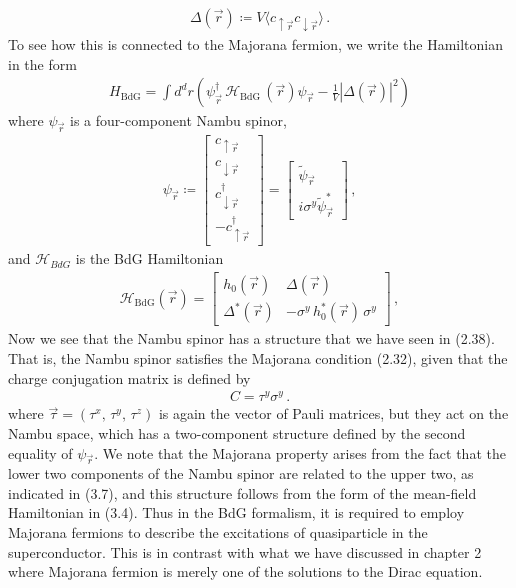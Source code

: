 \documentclass[11pt, oneside]{book}
\theoremstyle{break}
\theoremstyle{break}
\newcommand{\that}[1]{\widetilde{#1}}
\newcommand{\bmat}[1]{\begin{bmatrix} #1 \end{bmatrix}}
\begin{document}
\begin{align}
\Delta(\vec{r}) \coloneqq V\langle c_{\uparrow\vec{r}}c_{\downarrow \vec{r}}\rangle\,.
\end{align}
To see how this is connected to the Majorana fermion, we write the Hamiltonian in the form
\begin{align}
H_{\text{BdG}} = \int d^d r\left({\psi}_{\vec{r}}^\dagger\, \mathcal{H}_{\text{BdG}}\,(\vec{r}){\psi}_{\vec{r}} - \frac{1}{V}|\Delta (\vec{r})|^2\right)
\end{align}
where ${\psi}_{\vec{r}}$ is a four-component Nambu spinor,
\begin{align}
{\psi}_{\vec{r}} \coloneqq \bmat{c_{\uparrow\vec{r}} \\
c_{\downarrow\vec{r}}\\
c_{\downarrow\vec{r}}^\dagger\\
-c_{\uparrow\vec{r}}^\dagger} = \bmat{\that{\psi}_{\vec{r}} \\ i\sigma^y \that{\psi}_{\vec{r}}^*}\,,
\end{align}
and $\mathcal{H}_{BdG}$ is the BdG Hamiltonian 
\begin{align}
\mathcal{H}_{\text{BdG}}(\vec{r}) = \bmat{h_0(\vec{r}) & \Delta(\vec{r}) \\ \Delta^*(\vec{r}) & -\sigma^y \,h_0^*(\vec{r})\, \sigma^y}\,,
\end{align}
Now we see that the Nambu spinor has a structure that we have seen in (2.38). That is, the Nambu spinor satisfies the Majorana condition (2.32), given that the charge conjugation matrix is defined by 
\begin{align}
C = \tau^y  \sigma^y\,.
\end{align}
where $\vec{\tau} = (\tau^x, \, \tau^y,\, \tau^z)$ is again the vector of Pauli matrices, but they act on the Nambu space, which has a two-component structure defined by the second equality of ${\psi}_{\vec{r}}$. We note that the Majorana property arises from the fact that the lower two components of the Nambu spinor are related to the upper two, as indicated in (3.7), and this structure follows from the form of the mean-field Hamiltonian in (3.4). Thus in the BdG formalism, it is required to employ Majorana fermions to describe the excitations of quasiparticle in the superconductor. This is in contrast with what we have discussed in chapter 2 where Majorana fermion is merely one of the solutions to the Dirac equation. \\
\end{document}
